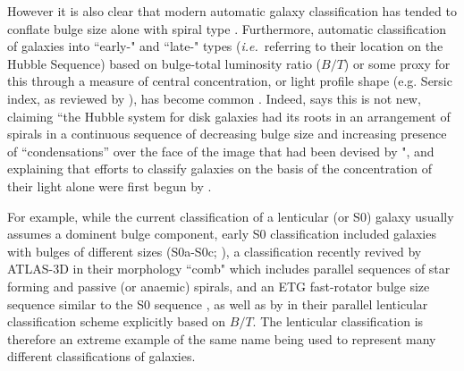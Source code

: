 \documentclass[usenatbib]{mn2e}
\newcommand{\ie}{{\it i.e.}}
\begin{document}
However it is also clear that modern automatic galaxy classification has tended to conflate bulge size alone with spiral type \citep[e.g.][]{Goto2003, Laurikainen2007, gadotti2009, Masters2010, Lange2016}. Furthermore, automatic classification of galaxies into ``early-" and ``late-" types (\ie ~referring to their location on the Hubble Sequence) based on bulge-total luminosity ratio ($B/T$) or some proxy for this through a measure of central concentration, or light profile shape (e.g. Sersic index, as reviewed by \citealt{2005PASA...22..118G}), has become common \citep[e.g.][]{vanderWel2011}. Indeed, \citet{Sandage2005} says this is not new, claiming ``the Hubble system for disk galaxies had its roots in an arrangement of spirals in a continuous sequence of decreasing bulge size and increasing presence of ``condensations'' over the face of the image that had been devised by \citet{Reynolds1920}", and explaining that efforts to classify galaxies on the basis of the concentration of their light alone were first begun by \citet{Shapley1927}. 

 For example, while the current classification of a lenticular (or S0) galaxy usually assumes a dominent bulge component, early S0 classification included galaxies with bulges of different sizes (S0a-S0c; \citealt{SpitzerBaade1951, vandenBergh1976}), a classification recently revived by ATLAS-3D in their morphology ``comb" which includes parallel sequences of star forming and passive (or anaemic) spirals, and an ETG fast-rotator bulge size sequence similar to the S0 sequence \citep{2011MNRAS.416.1680C}, as well as by \citet{Kormendy2012} in their parallel lenticular classification scheme explicitly based on $B/T$. The lenticular classification is therefore an extreme example of the same name being used to represent many different classifications of galaxies. 

\end{document}
